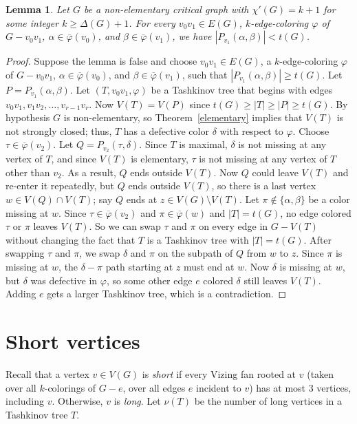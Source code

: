 \documentclass[12pt]{amsart}
\theoremstyle{plain}
\newtheorem{lem}[thm]{Lemma}
\theoremstyle{definition}
\theoremstyle{remark}
\newcommand{\vph}{\varphi}
\newcommand{\vphn}{\overline{\varphi}}
\begin{document}

\begin{lem}\label{FreeColorsLemma}
Let $G$ be a non-elementary critical graph with $\chi'(G) = k+1$ for some integer
$k \ge \Delta(G) + 1$.  For every $v_0v_1 \in E(G)$, $k$-edge-coloring $\vph$
of $G-v_0v_1$, $\alpha \in \vphn(v_0)$, and $\beta \in
\vphn(v_1)$, we have $|P_{v_1}(\alpha, \beta)| < t(G)$.
\end{lem}
\begin{proof}
Suppose the lemma is false and choose $v_0v_1 \in E(G)$, a $k$-edge-coloring
$\vph$ of $G-v_0v_1$, $\alpha \in \vphn(v_0)$, and $\beta \in \vphn(v_1)$, such
that $|P_{v_1}(\alpha, \beta)| \ge t(G)$.  Let $P = P_{v_1}(\alpha, \beta)$.  
Let $(T, v_0v_1, \vph)$ be a Tashkinov tree that
begins with edges $v_0v_1, v_1v_2, \ldots, v_{r-1}v_r$.  Now $V(T)=V(P)$ since
$t(G) \ge |T| \ge |P| \ge t(G)$.
By hypothesis $G$ is non-elementary, so Theorem~\ref{elementary} implies that
$V(T)$ is not strongly closed; thus, $T$ has a defective color $\delta$ with
respect to $\vph$.  Choose $\tau\in \vphn(v_2)$. Let $Q = P_{v_2}(\tau, \delta)$.
Since $T$ is maximal, $\delta$ is not missing at any vertex of $T$, and
since $V(T)$ is elementary, $\tau$ is not missing at any vertex of $T$ other 
than $v_2$.  As a result, $Q$ ends outside $V(T)$.  Now $Q$ could leave
$V(T)$ and re-enter it repeatedly, but $Q$ ends outside $V(T)$, so there is a
last vertex $w \in V(Q) \cap V(T)$; say $Q$ ends at $z \in V(G)\setminus V(T)$.
 Let $\pi \notin \{\alpha, \beta\}$ be a color missing at $w$.  
Since $\tau\in\vphn(v_2)$ and $\pi\in\vphn(w)$ and $|T| = t(G)$, no edge
colored $\tau$ or $\pi$ leaves $V(T)$.  So we can swap $\tau$ and $\pi$ on
every edge in $G - V(T)$ without changing the fact that $T$ is a Tashkinov tree
with $|T| = t(G)$.  After swapping $\tau$ and $\pi$, we swap $\delta$ and $\pi$
on the subpath of $Q$ from $w$ to $z$. Since $\pi$ is missing at $w$, the
$\delta-\pi$ path starting at $z$ must end at $w$.  Now $\delta$ is missing at
$w$, but $\delta$ was defective in $\vph$, so some other edge $e$ colored
$\delta$ still leaves $V(T)$. Adding $e$ gets a larger Tashkinov tree, which is
a contradiction.
\end{proof}


\section{Short vertices}
\label{sec:short}
Recall that a vertex $v \in V(G)$ is \emph{short} if every Vizing fan rooted
at $v$ (taken over all $k$-colorings of $G-e$, over all edges $e$ incident to
$v$) has at most 3 vertices, including $v$.  Otherwise, $v$ is \emph{long}.
Let $\nu(T)$ be the number of long vertices in a Tashkinov tree $T$.
\end{document}
